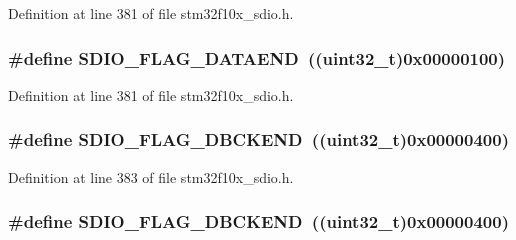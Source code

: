Definition at line 381 of file stm32f10x\+\_\+sdio.\+h.

\subsubsection[{\texorpdfstring{S\+D\+I\+O\+\_\+\+F\+L\+A\+G\+\_\+\+D\+A\+T\+A\+E\+ND}{SDIO_FLAG_DATAEND}}]{\setlength{\rightskip}{0pt plus 5cm}\#define S\+D\+I\+O\+\_\+\+F\+L\+A\+G\+\_\+\+D\+A\+T\+A\+E\+ND~(({\bf uint32\+\_\+t})0x00000100)}\hypertarget{group___s_d_i_o___flags_gaaacb2f6207c149e05f8bdd70e5d49926}{}\label{group___s_d_i_o___flags_gaaacb2f6207c149e05f8bdd70e5d49926}


Definition at line 381 of file stm32f10x\+\_\+sdio.\+h.

\subsubsection[{\texorpdfstring{S\+D\+I\+O\+\_\+\+F\+L\+A\+G\+\_\+\+D\+B\+C\+K\+E\+ND}{SDIO_FLAG_DBCKEND}}]{\setlength{\rightskip}{0pt plus 5cm}\#define S\+D\+I\+O\+\_\+\+F\+L\+A\+G\+\_\+\+D\+B\+C\+K\+E\+ND~(({\bf uint32\+\_\+t})0x00000400)}\hypertarget{group___s_d_i_o___flags_ga5452d8033567821709bd7d5f06547b70}{}\label{group___s_d_i_o___flags_ga5452d8033567821709bd7d5f06547b70}


Definition at line 383 of file stm32f10x\+\_\+sdio.\+h.

\subsubsection[{\texorpdfstring{S\+D\+I\+O\+\_\+\+F\+L\+A\+G\+\_\+\+D\+B\+C\+K\+E\+ND}{SDIO_FLAG_DBCKEND}}]{\setlength{\rightskip}{0pt plus 5cm}\#define S\+D\+I\+O\+\_\+\+F\+L\+A\+G\+\_\+\+D\+B\+C\+K\+E\+ND~(({\bf uint32\+\_\+t})0x00000400)}\hypertarget{group___s_d_i_o___flags_ga5452d8033567821709bd7d5f06547b70}{}\label{group___s_d_i_o___flags_ga5452d8033567821709bd7d5f06547b70}


